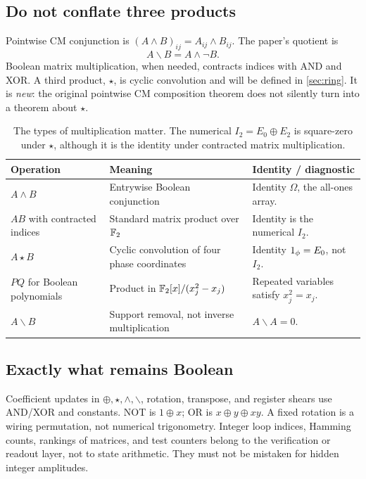 \subsection{Do not conflate three products}
Pointwise CM conjunction is $(A\land B)_{ij}=A_{ij}\land B_{ij}$. The paper's quotient is
\begin{equation}
 A\backslash B=A\land\neg B.
\end{equation}
Boolean matrix multiplication, when needed, contracts indices with AND and XOR. A third product, $\star$, is cyclic convolution and will be defined in \cref{sec:ring}. It is \emph{new}: the original pointwise CM composition theorem does not silently turn into a theorem about $\star$.

\begin{table}[htbp]\centering\small
\begin{tabularx}{\textwidth}{@{}L{0.23\textwidth}Y L{0.27\textwidth}@{}}\toprule
Operation & Meaning & Identity / diagnostic\\\midrule
$A\land B$ & Entrywise Boolean conjunction & Identity $\Omega$, the all-ones array.\\
$AB$ with contracted indices & Standard matrix product over $\mathbb F_2$ & Identity is the numerical $I_2$.\\
$A\star B$ & Cyclic convolution of four phase coordinates & Identity $1_{\phi}=E_0$, not $I_2$.\\
$P Q$ for Boolean polynomials & Product in $\mathbb F_2[x]/(x_j^2-x_j)$ & Repeated variables satisfy $x_j^2=x_j$.\\
$A\backslash B$ & Support removal, not inverse multiplication & $A\backslash A=0$.\\\bottomrule
\end{tabularx}
\caption{The types of multiplication matter. The numerical $I_2=E_0\oplus E_2$ is square-zero under $\star$, although it is the identity under contracted matrix multiplication.}
\end{table}

\subsection{Exactly what remains Boolean}
Coefficient updates in $\oplus,\star,\land,\backslash$, rotation, transpose, and register shears use AND/XOR and constants. NOT is $1\oplus x$; OR is $x\oplus y\oplus xy$. A fixed rotation is a wiring permutation, not numerical trigonometry. Integer loop indices, Hamming counts, rankings of matrices, and test counters belong to the verification or readout layer, not to state arithmetic. They must not be mistaken for hidden integer amplitudes.

